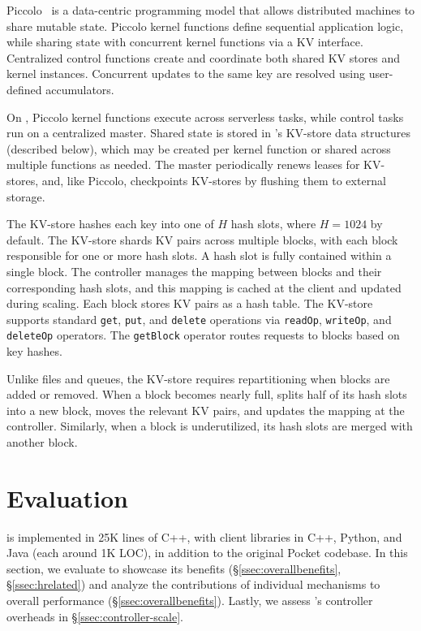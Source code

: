 Piccolo~\cite{piccolo} is a data-centric programming model that allows distributed machines to share mutable state. Piccolo kernel functions define sequential application logic, while sharing state with concurrent kernel functions via a KV interface. Centralized control functions create and coordinate both shared KV stores and kernel instances. Concurrent updates to the same key are resolved using user-defined accumulators.

On \jiffy, Piccolo kernel functions execute across serverless tasks, while control tasks run on a centralized master. Shared state is stored in \jiffy’s KV-store data structures (described below), which may be created per kernel function or shared across multiple functions as needed. The master periodically renews leases for \jiffy KV-stores, and, like Piccolo, \jiffy checkpoints KV-stores by flushing them to external storage.

 The \jiffy KV-store hashes each key into one of $H$ hash slots, where $H = 1024$ by default. The KV-store shards KV pairs across multiple \jiffy blocks, with each block responsible for one or more hash slots. A hash slot is fully contained within a single block. The controller manages the mapping between blocks and their corresponding hash slots, and this mapping is cached at the client and updated during scaling. Each block stores KV pairs as a hash table. The KV-store supports standard \texttt{get}, \texttt{put}, and \texttt{delete} operations via \texttt{readOp}, \texttt{writeOp}, and \texttt{deleteOp} operators. The \texttt{getBlock} operator routes requests to blocks based on key hashes.

Unlike files and queues, the KV-store requires repartitioning when blocks are added or removed. When a block becomes nearly full, \jiffy splits half of its hash slots into a new block, moves the relevant KV pairs, and updates the mapping at the controller. Similarly, when a block is underutilized, its hash slots are merged with another block.




\section{Evaluation}
\label{sec:jiffyevaluation}
\jiffy is implemented in 25K lines of C++, with client libraries in C++, Python, and Java (each around 1K LOC), in addition to the original Pocket codebase. In this section, we evaluate \jiffy to showcase its benefits (\S\ref{ssec:overallbenefits}, \S\ref{ssec:hrelated}) and analyze the contributions of individual \jiffy mechanisms to overall performance (\S\ref{ssec:overallbenefits}). Lastly, we assess \jiffy’s controller overheads in \S\ref{ssec:controller-scale}.

